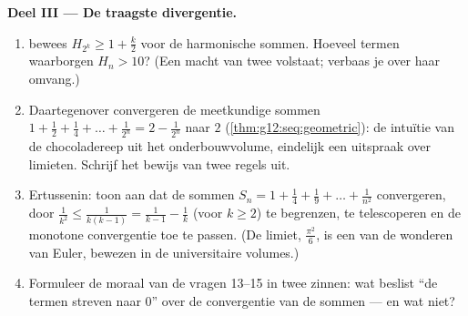 \begin{problem}
\medskip
\noindent\textbf{Deel III --- De traagste divergentie.}
\begin{enumerate}[resume]
  \item {} bewees $H_{2^k} \geq 1 + \frac k2$ voor de
        harmonische sommen. Hoeveel termen waarborgen $H_n > 10$? (Een macht
        van twee volstaat; verbaas je over haar omvang.)
  \item Daartegenover convergeren de meetkundige sommen
        $1 + \frac12 + \frac14 + \dots + \frac{1}{2^n} = 2 - \frac{1}{2^n}$
        naar $2$ (\cref{thm:g12:seq:geometric}): de intuïtie van de
        chocoladereep uit het onderbouwvolume, eindelijk een uitspraak over
        limieten. Schrijf het bewijs van twee regels uit.
  \item Ertussenin: toon aan dat de sommen
        $S_n = 1 + \frac{1}{4} + \frac{1}{9} + \dots + \frac{1}{n^2}$
        convergeren, door $\frac{1}{k^2} \leq \frac{1}{k(k-1)} =
        \frac{1}{k-1} - \frac{1}{k}$ (voor $k \geq 2$) te begrenzen, te
        telescoperen en de monotone convergentie toe te passen. (De limiet,
        $\frac{\pi^2}{6}$, is een van de wonderen van Euler, bewezen in de
        universitaire volumes.)
  \item Formuleer de moraal van de vragen 13--15 in twee zinnen: wat beslist
        ``de termen streven naar $0$'' over de convergentie van de sommen ---
        en wat niet?
\end{enumerate}


\end{problem}
